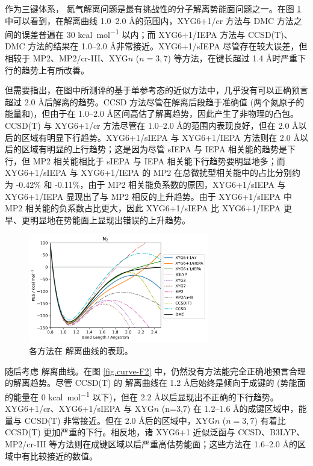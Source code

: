 作为三键体系， 氮气解离问题是最有挑战性的分子解离势能面问题之一。在图 \ref{fig.curve-N2} 中可以看到，在解离曲线 1.0--2.0 \AA 的范围内，XYG6+1/cr 方法与 DMC 方法之间的误差普遍在 30 \si{kcal.mol^{-1}} 以内；而 XYG6+1/IEPA 方法与 CCSD(T)、DMC 方法的结果在 1.0--2.0 \AA 非常接近。XYG6+1/sIEPA 尽管存在较大误差，但相较于 MP2、MP2/cr-III、XYG$n$ ($n=3,7$) 等方法，在键长超过 1.4 \AA 时严重下行的趋势上有所改善。

但需要指出，在图中所测评的基于单参考态的近似方法中，几乎没有可以正确预言超过 2.0 \AA 后解离的趋势。CCSD 方法尽管在解离后段趋于准确值 (两个氮原子的能量和)，但由于在 1.0--2.0 \AA 区间高估了解离趋势，因此产生了非物理的凸包。CCSD(T) 与 XYG6+1/cr 方法尽管在 1.0--2.0 \AA 的范围内表现良好，但在 2.0 \AA 以后的区域有明显下行趋势。XYG6+1/sIEPA 与 XYG6+1/IEPA 方法则在 2.0 \AA 以后的区域有明显的上行趋势；这是因为尽管 sIEPA 与 IEPA 相关能的趋势是下行，但 MP2 相关能相比于 sIEPA 与 IEPA 相关能下行趋势要明显地多；而 XYG6+1/sIEPA 与 XYG6+1/IEPA 的 MP2 在总微扰型相关能中的占比分别约为 -0.42\% 和 -0.11\%，由于 MP2 相关能负系数的原因，XYG6+1/sIEPA 与 XYG6+1/IEPA 显现出了与 MP2 相反的上升趋势。由于 XYG6+1/sIEPA 中 MP2 相关能的负系数占比更大，因此 XYG6+1/sIEPA 比 XYG6+1/IEPA 更早、更明显地在势能面上显现出错误的上升趋势。

\begin{figure}[h]
  \centering
  \caption{各方法在  解离曲线的表现。}
  \label{fig.curve-N2}
  \includegraphics[width=0.7\textwidth]{assets/curve-N2.pdf}
\end{figure}

随后考虑  解离曲线。在图 \ref{fig.curve-F2} 中，仍然没有方法能完全正确地预言合理的解离趋势。尽管 CCSD(T) 的  解离曲线在 1.2 \AA 后始终是倾向于成键的 (势能面的能量在 0 \si{kcal.mol^{-1}} 以下)，但在 2.2 \AA 以后显现出不正确的下行趋势。XYG6+1/cr、XYG6+1/sIEPA 与 XYG$n$ (n=3,7) 在 1.2--1.6 \AA 的成键区域中，能量与 CCSD(T) 非常接近。但在 2.0 \AA 后的区域中，XYG$n$ ($n=3,7$) 有着比 CCSD(T) 更加严重的下行。相反地，诸 XYG6+1 近似泛函与 CCSD、B3LYP、MP2/cr-III 等方法则在成键区域以后严重高估势能面；这些方法在 1.6--2.0 \AA 的区域中有比较接近的数值。


